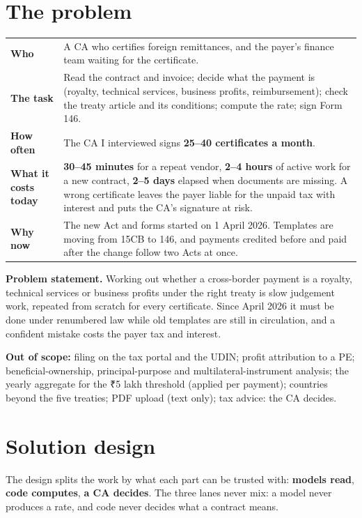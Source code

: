 \documentclass[10pt,a4paper]{article}
\newcommand{\lane}[2]{\textcolor{#1}{\textbf{#2}}}
\begin{document}
\section{The problem}
\begin{tabularx}{\linewidth}{@{}>{\bfseries}p{31mm}L@{}}
\toprule
Who & A CA who certifies foreign remittances, and the payer's finance team waiting for the certificate.\\
The task & Read the contract and invoice; decide what the payment is (royalty, technical services, business profits, reimbursement); check the treaty article and its conditions; compute the rate; sign Form 146.\\
How often & The CA I interviewed signs \textbf{25--40 certificates a month}.\\
What it costs today & \textbf{30--45 minutes} for a repeat vendor, \textbf{2--4 hours} of active work for a new contract, \textbf{2--5 days} elapsed when documents are missing. A wrong certificate leaves the payer liable for the unpaid tax with interest and puts the CA's signature at risk.\\
Why now & The new Act and forms started on 1 April 2026. Templates are moving from 15CB to 146, and payments credited before and paid after the change follow two Acts at once.\\
\bottomrule
\end{tabularx}
\vspace{2pt}
\begin{keybox}
\textbf{Problem statement.} Working out whether a cross-border payment is a royalty, technical services or business profits under the right treaty is slow judgement work, repeated from scratch for every certificate. Since April 2026 it must be done under renumbered law while old templates are still in circulation, and a confident mistake costs the payer tax and interest.
\end{keybox}
\textbf{Out of scope:} filing on the tax portal and the UDIN; profit attribution to a PE; beneficial-ownership, principal-purpose and multilateral-instrument analysis; the yearly aggregate for the ₹5 lakh threshold (applied per payment); countries beyond the five treaties; PDF upload (text only); tax advice: the CA decides.

\section{Solution design}
The design splits the work by what each part can be trusted with: \lane{ai}{models read}, \lane{rules}{code computes}, \lane{ca}{a CA decides}. The three lanes never mix: a model never produces a rate, and code never decides what a contract means.
\end{document}
